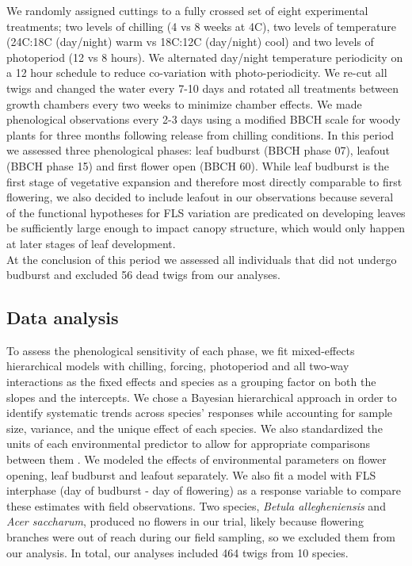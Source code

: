 \documentclass[12pt]{article}\usepackage[]{graphicx}\usepackage[]{color}
\begin{document}
\noindent We randomly assigned cuttings to a fully crossed set of eight experimental treatments; two levels of chilling (4 vs 8 weeks at 4\degree C), two levels of temperature (24\degree C:18\degree C (day/night) warm vs 18\degree C:12\degree C (day/night) cool) and two levels of photoperiod (12 vs 8 hours). We alternated day/night temperature periodicity on a 12 hour schedule to reduce co-variation with photo-periodicity. We re-cut all twigs and changed the water every 7-10 days and rotated all treatments between growth chambers every two weeks to minimize chamber effects. We made phenological observations every 2-3 days using a modified BBCH scale for woody plants \citep{Finn2007} for three months following release from chilling conditions. In this period we assessed three phenological phases: leaf budburst (BBCH phase 07), leafout (BBCH phase 15) and first flower open (BBCH 60). While leaf budburst is the first stage of vegetative expansion and therefore most directly comparable to first flowering, we also decided to include leafout in our observations because several of the functional hypotheses for FLS variation are predicated on developing leaves be sufficiently large enough to impact canopy structure, which would only happen at later stages of leaf development.\\

\noindent At the conclusion of this period we assessed all individuals that did not undergo budburst and excluded 56 dead twigs from our analyses. 

\subsection*{Data analysis}
\noindent To assess the phenological sensitivity of each phase, we fit mixed-effects hierarchical models with chilling, forcing, photoperiod and all two-way interactions as the fixed effects and species as a grouping factor on both the slopes and the intercepts. We chose a Bayesian hierarchical approach in order to identify systematic trends across species' responses while accounting for sample size, variance, and the unique effect of each species. We also standardized the units of each environmental predictor to allow for appropriate comparisons between them \citep{Gelman2007}. We modeled the effects of environmental parameters on flower opening, leaf budburst and leafout separately. We also fit a model with FLS interphase (day of budburst - day of flowering) as a response variable to compare these estimates with field observations. Two species, \textit{Betula allegheniensis} and \textit{Acer saccharum}, produced no flowers in our trial, likely because flowering branches were out of reach during our field sampling, so we excluded them from our analysis. In total, our analyses included 464 twigs from 10 species. \\ 
\end{document}
